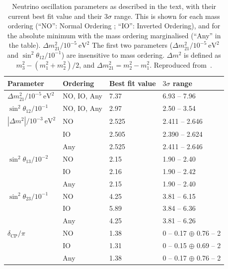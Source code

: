 \begin{table}[ht!]
  \begin{adjustbox}{center}
    \begin{tabular}{llll}
      \toprule
      Parameter & Ordering & Best fit value& $3 \sigma$ range  \\
      \midrule%
      $\Delta m_{21}^2/10^{-5}~\mathrm{eV}^2 $ & NO, IO, Any & 7.37 & 6.93 -- 7.96 \\
      \midrule%
      $\sin^2 \theta_{12}/10^{-1}$        & NO, IO, Any & 2.97 & 2.50 -- 3.54 \\
      \midrule%
      $|\Delta m^2|/10^{-3}~\mathrm{eV}^2 $ & NO  & 2.525 & 2.411 -- 2.646 \\
                & IO  & 2.505 & 2.390 -- 2.624 \\
                & Any & 2.525 & 2.411 -- 2.646 \\
      \midrule%
      $\sin^2 \theta_{13}/10^{-2}$ & NO  & 2.15 & 1.90 -- 2.40 \\
                & IO  & 2.16 & 1.90 -- 2.42 \\
                & Any & 2.15 & 1.90 -- 2.40 \\
      \midrule%
      $\sin^2 \theta_{23}/10^{-1}$ & NO  & 4.25 & 3.81 -- 6.15 \\
                & IO  & 5.89 & 3.84 -- 6.36 \\
                & Any & 4.25 & 3.81 -- 6.26 \\
      \midrule%
      $\delta_{\text{CP}}/\pi$ & NO  & 1.38 & 0 -- 0.17 $\oplus$ 0.76 -- 2 \\
                & IO  & 1.31 & 0 -- 0.15 $\oplus$ 0.69 -- 2 \\
                & Any & 1.38 & 0 -- 0.17 $\oplus$ 0.76 -- 2 \\
      \bottomrule  
   \end{tabular}
   \end{adjustbox}
   \caption[Current neutrino oscillation parameters]{Neutrino
     oscillation parameters as described in the text, with their
     current best fit value and their $3\sigma$ range. This is shown
     for each mass ordering (``NO'': Normal Ordering ; ``IO'':
     Inverted Ordering), and for the absolute minimum with the mass
     ordering marginalised (``Any'' in the table).
     $\Delta m_{21}^2/10^{-5}~\mathrm{eV}^2 $ The first two parameters
     ($\Delta m_{21}^2/10^{-5}~\mathrm{eV}^2 $ and
     $\sin^2 \theta_{12}/10^{-1}$) are insensitive to mass
     ordering. $\Delta m^2$ is defined as $m_3^2 - (m^2_1+m^2_2)/2$,
     and $\Delta m_{21}^{2} = m^2_2-m^2_1$. Reproduced
     from~\cite{2017Capozzi}.}

\label{tab:oscillation_parameters}
\end{table}
\clearpage

